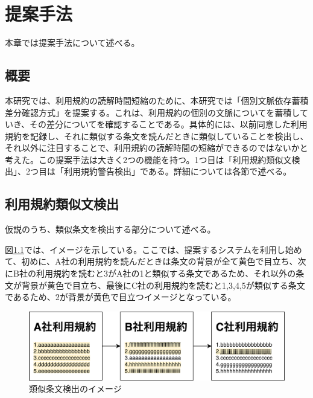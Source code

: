 \chapter{提案手法}
\label{proposed}

本章では提案手法について述べる。

\section{概要}
本研究では、利用規約の読解時間短縮のために、本研究では「個別文脈依存蓄積差分確認方式」を提案する。これは、利用規約の個別の文脈についてを蓄積していき、その差分についてを確認することである。具体的には、以前同意した利用規約を記録し、それに類似する条文を読んだときに類似していることを検出し、それ以外に注目することで、利用規約の読解時間の短縮ができるのではないかと考えた。この提案手法は大きく2つの機能を持つ。1つ目は「利用規約類似文検出」、2つ目は「利用規約警告検出」である。詳細については各節で述べる。

\section{利用規約類似文検出}
\label{sub:利用規約類似文検出}
仮説のうち、類似条文を検出する部分について述べる。

図\ref{img:demo}では、イメージを示している。ここでは、提案するシステムを利用し始めて、初めに、A社の利用規約を読んだときは条文の背景が全て黄色で目立ち、次にB社の利用規約を読むと3がA社の1と類似する条文であるため、それ以外の条文が背景が黄色で目立ち、最後にC社の利用規約を読むと1,3,4,5が類似する条文であるため、2が背景が黄色で目立つイメージとなっている。
\begin{figure}[h]
  \begin{center}
      \includegraphics[width=15cm]{img/demo.drawio.png}
      \caption{類似条文検出のイメージ}
      \label{img:demo}
  \end{center}
\end{figure}

